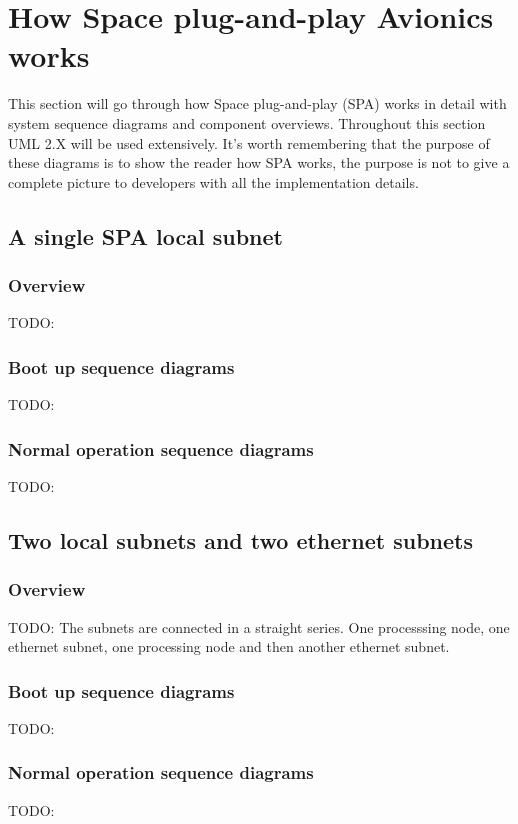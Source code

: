 \chapter{How Space plug-and-play Avionics works}\label{ch:spa}
This section will go through how Space plug-and-play (SPA) works in detail with
system sequence diagrams and component overviews. Throughout this
section UML 2.X will be used extensively. It's worth remembering that the
purpose of these diagrams is to show the reader how SPA works, the purpose
is not to give a complete picture to developers with all the implementation
details.

\section{A single SPA local subnet}
\subsection{Overview}
TODO:

\subsection{Boot up sequence diagrams}
TODO:

\subsection{Normal operation sequence diagrams}
TODO:

\section{Two local subnets and two ethernet subnets}
\subsection{Overview}
TODO: The subnets are connected in a straight series. One processsing node, one
ethernet subnet, one processing node and then another ethernet subnet.

\subsection{Boot up sequence diagrams}
TODO:

\subsection{Normal operation sequence diagrams}
TODO:

